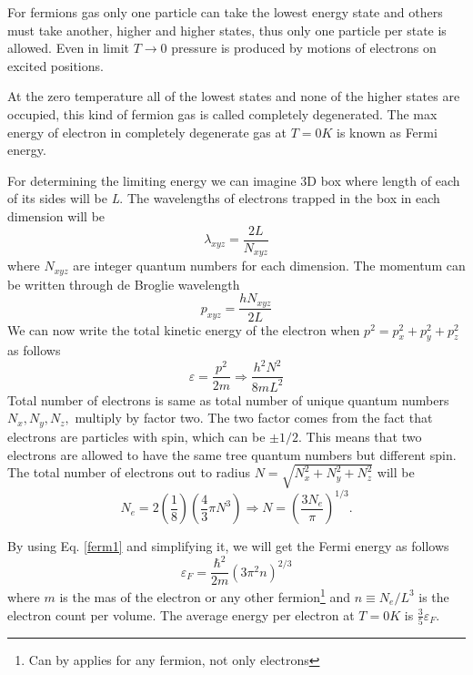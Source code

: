\documentclass[oneside,a4paper,11pt]{report}
\begin{document}
For fermions gas only one particle can take the lowest energy state and others must 
take another, higher and higher states, thus only one particle per state is allowed. 
Even in limit $T\rightarrow0$ pressure is produced by motions of electrons on excited positions.       

At the zero temperature all of the lowest states and none of the higher states are 
occupied, this kind of fermion gas is called completely degenerated. 
The max energy of electron in completely degenerate gas at $T=0 K$ is known as Fermi energy. 

For determining the limiting energy we can imagine 3D box where length of each of its sides will be \textit{L}.  
The wavelengths of electrons trapped in the box in each dimension will be
\begin{equation}
\lambda_{xyz} = \frac{2L}{N_{xyz}}
\end{equation}
where $N_{xyz}$ are integer quantum numbers for each dimension. The momentum can be written 
through de Broglie wavelength
\begin{equation}
p_{xyz} = \frac{hN_{xyz}}{2L}
\end{equation}
We can now write the total kinetic energy of the electron when $p^2 = p_x^2 + p_y^2 + p_z^2$ as follows
\begin{equation}
\label{ferm1}
 \varepsilon =  \frac{p^2}{2m} \Rightarrow \frac{h^2N^2}{8mL^2}
\end{equation}
Total number of electrons is same as total number of unique quantum numbers $N_x, N_y, N_z,$ multiply by 
factor two. The two factor comes from the fact that electrons are particles with spin, which can be $\pm 1/2$. 
This means that two electrons are allowed to have the same tree quantum numbers but different spin. 
The total number of electrons out to radius $N = \sqrt{N_x^2 + N_y^2 + N_z^2}$ will be
\begin{equation}
 N_e = 2\left ( \frac{1}{8} \right )\left ( \frac{4}{3} \pi N^3\right ) \Rightarrow N = \left ( \frac{3N_e}{\pi} \right )^{1/3} .
\end{equation}

By using Eq. \eqref{ferm1} and simplifying it, we will get the Fermi energy as follows
\begin{equation}
\varepsilon_F = \frac{\hbar^2}{2m}\left ( 3\pi^2n \right )^{2/3}
\end{equation}
where $m$ is the mas of the electron or any other fermion\footnote{Can by applies for any fermion, not only electrons} 
and $n\equiv N_e/L^3$ is the electron count per volume. 
The average energy per electron at $T = 0K$ is $\frac{3}{5}\varepsilon_F$.    
  
\end{document}
